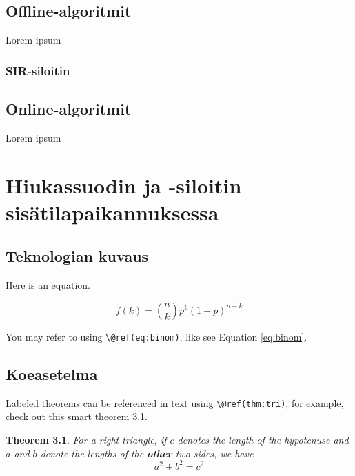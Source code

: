 \documentclass[
  12pt,
  a4paper, twoside]{book}
\newtheorem{theorem}{Theorem}[chapter]
\theoremstyle{definition}
\theoremstyle{definition}
\theoremstyle{definition}
\theoremstyle{definition}
\theoremstyle{remark}
\begin{document}
\hypertarget{offline-algoritmit}{%
\section{Offline-algoritmit}\label{offline-algoritmit}}

Lorem ipsum

\hypertarget{sir-siloitin}{%
\subsection{SIR-siloitin}\label{sir-siloitin}}

\hypertarget{online-algoritmit}{%
\section{Online-algoritmit}\label{online-algoritmit}}

Lorem ipsum

\hypertarget{hiukassuodin-ja--siloitin-sisuxe4tilapaikannuksessa}{%
\chapter{Hiukassuodin ja -siloitin sisätilapaikannuksessa}\label{hiukassuodin-ja--siloitin-sisuxe4tilapaikannuksessa}}

\hypertarget{teknologian-kuvaus}{%
\section{Teknologian kuvaus}\label{teknologian-kuvaus}}

Here is an equation.

\begin{equation} 
  f\left(k\right) = \binom{n}{k} p^k\left(1-p\right)^{n-k}
  \label{eq:binom}
\end{equation}

You may refer to using \texttt{\textbackslash{}@ref(eq:binom)}, like see Equation \eqref{eq:binom}.

\hypertarget{koeasetelma}{%
\section{Koeasetelma}\label{koeasetelma}}

Labeled theorems can be referenced in text using \texttt{\textbackslash{}@ref(thm:tri)}, for example, check out this smart theorem \ref{thm:tri}.

\begin{theorem}
\protect\hypertarget{thm:tri}{}\label{thm:tri}For a right triangle, if \(c\) denotes the \emph{length} of the hypotenuse
and \(a\) and \(b\) denote the lengths of the \textbf{other} two sides, we have
\[a^2 + b^2 = c^2\]
\end{theorem}
\end{document}
